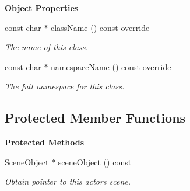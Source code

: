 \begin{Indent}\textbf{ Object Properties}\par
\begin{DoxyCompactItemize}
\item 
const char $\ast$ \mbox{\hyperlink{classrev_1_1_physics_actor_a5bc3e96948718546204f3201971e1914}{class\+Name}} () const override
\begin{DoxyCompactList}\small\item\em The name of this class. \end{DoxyCompactList}\item 
const char $\ast$ \mbox{\hyperlink{classrev_1_1_physics_actor_ad212df8d7d61f9b855bc9d9ede2b437f}{namespace\+Name}} () const override
\begin{DoxyCompactList}\small\item\em The full namespace for this class. \end{DoxyCompactList}\end{DoxyCompactItemize}
\end{Indent}
\subsection*{Protected Member Functions}
\begin{Indent}\textbf{ Protected Methods}\par
\begin{DoxyCompactItemize}
\item 
\mbox{\label{classrev_1_1_physics_actor_ac9681230fc20c568eefd14cbfb22bb25}} 
\mbox{\hyperlink{classrev_1_1_scene_object}{Scene\+Object}} $\ast$ \mbox{\hyperlink{classrev_1_1_physics_actor_ac9681230fc20c568eefd14cbfb22bb25}{scene\+Object}} () const
\begin{DoxyCompactList}\small\item\em Obtain pointer to this actor\textquotesingle{}s scene. \end{DoxyCompactList}\end{DoxyCompactItemize}
\end{Indent}
